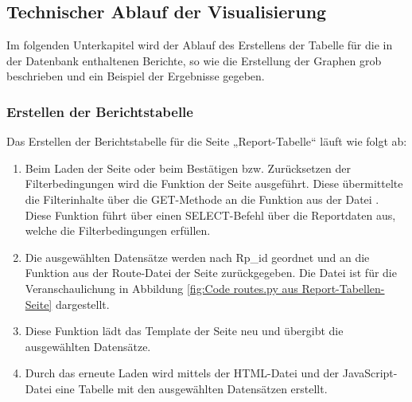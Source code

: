 \subsection{Technischer Ablauf der Visualisierung}
\label{subsec:technische-details-zur-visualisierung}


Im folgenden Unterkapitel wird der Ablauf des Erstellens der Tabelle für die in der Datenbank enthaltenen Berichte, so wie die
Erstellung der Graphen grob beschrieben und ein Beispiel der Ergebnisse gegeben.

\subsubsection{Erstellen der Berichtstabelle}

Das Erstellen der Berichtstabelle für die Seite „Report-Tabelle“ läuft wie folgt ab:

\begin{enumerate}

    \item Beim Laden der Seite oder beim Bestätigen bzw. Zurücksetzen der Filterbedingungen wird die Funktion  der Seite ausgeführt.
    Diese übermittelte die Filterinhalte über die GET-Methode an die Funktion  aus der Datei .
    Diese Funktion führt über  einen SELECT-Befehl über die Reportdaten aus, welche die Filterbedingungen erfüllen.
    \item Die ausgewählten Datensätze werden nach Rp\_id geordnet und an die Funktion  aus der Route-Datei der Seite zurückgegeben.
    Die Datei  ist für die Veranschaulichung in Abbildung \ref{fig:Code routes.py aus Report-Tabellen-Seite} dargestellt.
    \item Diese Funktion lädt das Template der Seite neu und übergibt die ausgewählten Datensätze.
    \item Durch das erneute Laden wird mittels der HTML-Datei  und der JavaScript-Datei  eine Tabelle mit den
    ausgewählten Datensätzen erstellt.

\end{enumerate}

